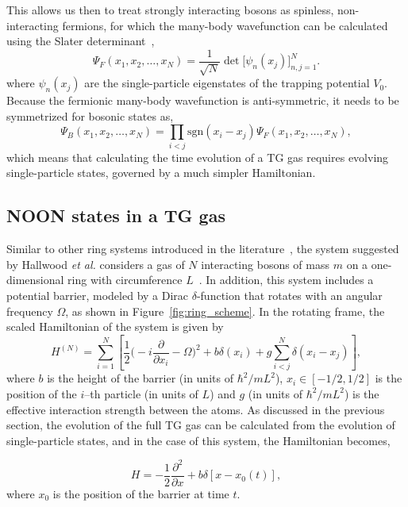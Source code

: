 \noindent This allows us then to treat strongly interacting bosons as spinless, non-interacting fermions, for which the many-body wavefunction can be calculated using the Slater determinant~\cite{slater1929},
\begin{equation}
\Psi_F (x_1, x_2, \ldots, x_N) = \frac{1}{\sqrt{N}} \det\Big[\psi_n(x_j)\Big]_{n,j=1}^N.
\end{equation}
\noindent where $\psi_n(x_j)$ are the single-particle eigenstates of the trapping potential $V_0$.
Because the fermionic many-body wavefunction is anti-symmetric, it needs to be symmetrized for bosonic states as, 
\begin{equation}
\Psi_B(x_1, x_2, \ldots, x_N) =
\prod_{i < j}
\mathrm{sgn}(x_i - x_j)\Psi_F(x_1, x_2, \ldots, x_N),
\end{equation}
\noindent which means that calculating the time evolution of a TG gas requires evolving single-particle states, governed by a much simpler Hamiltonian.

\subsection{NOON states in a TG gas}
\label{sec:controltro}

Similar to other ring systems introduced in the literature~\cite{das2002,girardeau2009}, the system suggested by Hallwood \textit{et al.} considers a gas of $N$ interacting bosons of mass $m$ on a one-dimensional ring with circumference $L$~\cite{hallwood2010}.
In addition, this system includes a potential barrier, modeled by a Dirac $\delta$-function that rotates with an angular frequency $\Omega$, as shown in Figure~\ref{fig:ring_scheme}.
In the rotating frame, the scaled Hamiltonian of the system is given by \cite{hallwood2010}
\begin{equation}H^{(N)} = \sum_{i=1} ^{N} \left[{\frac{1}{2}\bigg(-i\frac{\partial}{\partial x_i}-\Omega}\bigg)^2 + b\delta(x_i) +g \sum_{i<j} ^{N} \delta (x_i - x_j )\right],
\end{equation}
\noindent where $b$ is the height of the barrier (in units of $\hbar^2/mL^2$), $x_i \in \left[-1/2,1/2\right]$ is the position of the $i$--th particle (in units of $L$) and $g$ (in units of $\hbar^2/mL^2$) is the effective interaction strength between the atoms.
As discussed in the previous section, the evolution of the full TG gas can be calculated from the evolution of single-particle states, and in the case of this system, the Hamiltonian becomes,

\begin{equation}
H = -\frac{1}{2} \frac{\partial^2}{\partial x} + b\delta \left[ x-x_0(t) \right], 
\end{equation}
where $x_0$ is the position of the barrier at time $t$. 

